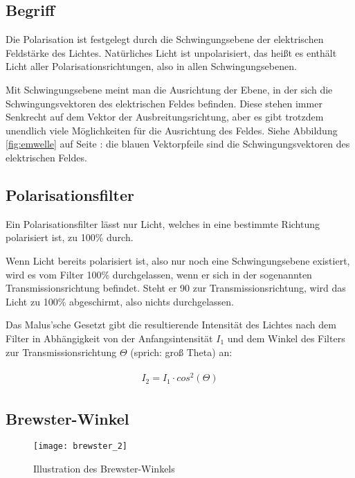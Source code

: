 \subsection{Begriff}

Die Polarisation ist festgelegt durch die Schwingungsebene der elektrischen Feldstärke des Lichtes. Natürliches Licht ist unpolarisiert, das heißt es enthält Licht aller Polarisationsrichtungen, also in allen Schwingungsebenen.

Mit Schwingungsebene meint man die Ausrichtung der Ebene, in der sich die Schwingungsvektoren des elektrischen Feldes befinden. Diese stehen immer Senkrecht auf dem Vektor der Ausbreitungsrichtung, aber es gibt trotzdem unendlich viele Möglichkeiten für die Ausrichtung des Feldes. Siehe Abbildung \ref{fig:emwelle} auf Seite \pageref{fig:emwelle}: die blauen Vektorpfeile sind die Schwingungsvektoren des elektrischen Feldes.

\subsection{Polarisationsfilter}

Ein Polarisationsfilter lässt nur Licht, welches in eine bestimmte Richtung polarisiert ist, zu 100\% durch. 

Wenn Licht bereits polarisiert ist, also nur noch eine Schwingungsebene existiert, wird es vom Filter 100\% durchgelassen, wenn er sich in der sogenannten Transmissionsrichtung befindet. Steht er 90\degree{} zur Transmissionsrichtung, wird das Licht zu 100\% abgeschirmt, also nichts durchgelassen.

Das Malus'sche Gesetzt gibt die resultierende Intensität des Lichtes nach dem Filter in Abhängigkeit von der Anfangsintensität $I_1$ und dem Winkel des Filters zur Transmissionsrichtung $\Theta$ (sprich: \glqq groß Theta\grqq ) an:

\begin{align}
\begin{split}
	I_2 = I_1 \cdot cos^2(\Theta)
\end{split}
\end{align}


\subsection{Brewster-Winkel}

\begin{wrapfigure}{o}{0.5\textwidth}
	\centering \texttt{[image: brewster\_2]}
	\caption{Illustration des Brewster-Winkels}
	\label{fig:brewster}
\end{wrapfigure}

